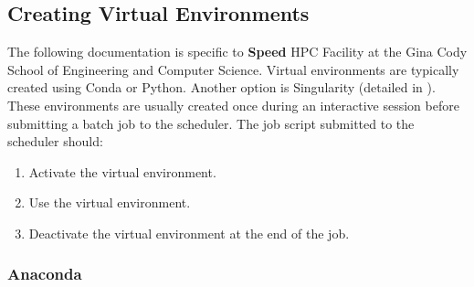 \documentclass{easychair}
\begin{document}
\subsection{Creating Virtual Environments}
\label{sect:environments}
\label{sect:examples-venv}

The following documentation is specific to \textbf{Speed} HPC Facility at the
Gina Cody School of Engineering and Computer Science.
%
Virtual environments are typically created using Conda or Python.
Another option is Singularity (detailed in ).
These environments are usually created once during an interactive session 
before submitting a batch job to the scheduler. 
The job script submitted to the scheduler should:
\begin{enumerate}
	\item Activate the virtual environment.
	\item Use the virtual environment.
	\item Deactivate the virtual environment at the end of the job.
\end{enumerate}

\subsubsection{Anaconda}
\label{sect:conda-venv}
\end{document}
